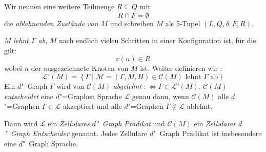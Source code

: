 \documentclass[11pt]{article}
\newcommand{\defWord}[1]{\emph{#1}}
\begin{document}
\begin{definition}
	Wir nennen eine weitere Teilmenge $R \subseteq Q$ mit 
	\begin{displaymath}
		R \cap F = \emptyset
	\end{displaymath} 
	die \defWord{ablehnenden Zustände von $M$} und schreiben $M$ als 5-Tupel $\left(L, Q, \delta, F, R\right)$.
	
	$M$ \defWord{lehnt $\Gamma$ ab}, $M$ nach endlich vielen Schritten in einer Konfiguration ist, für die gilt: 
	\begin{displaymath}
		c(n) \in R
	\end{displaymath}
	wobei $n$ der ausgezeichnete Knoten von $M$ ist.
	Weiter definieren wir : 
	\begin{displaymath}
		\mathcal{L}'(M) = \left\{\Gamma \mid \mathcal{M} = \left(\Gamma, M, H\right) \in \mathcal{C}(M) \text{ lehnt } \Gamma \text{ ab}\right\}
	\end{displaymath}
	Ein $d$"~Graph $\Gamma$ wird von $\mathcal{C}(M)$ \defWord{abgelehnt} $:\iff \Gamma \in \mathcal{L}'(M)$.
	$\mathcal{C}(M)$ \defWord{entscheidet} eine $d$"=Graphen Sprache $\mathcal{L}$ genau dann, wenn $\mathcal{C}(M)$ alle $d$"=Graphen $\Gamma \in \mathcal{L}$ akzeptiert und alle $d$"=Graphen $\Gamma \notin \mathcal{L}$ ablehnt.
	
	Dann wird $\mathcal{L}$ ein \defWord{Zellulares $d$"~Graph Prädikat} und $\mathcal{C}(M)$ ein \defWord{Zellularer $d$"~Graph Entscheider} genannt. 
	Jedes Zellulare $d$"~Graph Prädikat ist insbesondere eine $d$"~Graph Sprache.
\end{definition}
\end{document}
